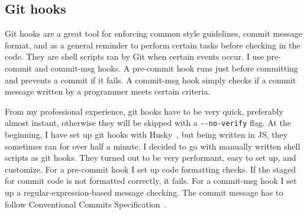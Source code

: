 \subsection{Git hooks}\label{sec:git-hooks}

Git hooks are a great tool
for enforcing common style guidelines,
commit message format,
and as a general reminder
to perform certain tasks before checking in the code.
They are shell scripts ran by Git
when certain events occur.
I use pre-commit and commit-msg hooks.
A pre-commit hook runs just before committing
and prevents a commit if it fails.
A commit-msg hook simply checks
if a commit message written by a programmer
meets certain criteria.

From my professional experience,
git hooks have to be very quick,
preferably almost instant,
otherwise they will be skipped
with a \texttt{{-}{-}no-verify} flag.
At the beginning,
I have set up git hooks
with Husky~\cite{typicode_husky_2022},
but being written in JS,
they sometimes ran for over half a minute.
I decided to go with manually written shell scripts
as git hooks.
They turned out to be very performant,
easy to set up, and customize.
For a pre-commit hook I set up code formatting checks.
If the staged for commit code is not formatted correctly,
it fails.
For a commit-msg hook I set up a regular-expression-based
message checking.
The commit message has to follow
Conventional Commits Specification~\cite{petrungaro_conventional_2019}.
